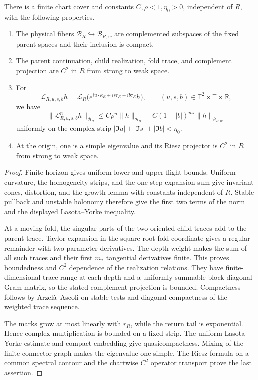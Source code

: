 \begin{theorem}
\label{thm:r16-a2-bundle}
There is a finite chart cover and constants
\(C,\rho<1,\eta_0>0\), independent of \(R\), with the following properties.
\begin{enumerate}[label=(\roman*)]
\item The physical fibers \(\mathcal B_R\hookrightarrow\mathcal B_{R,w}\)
are complemented subspaces of the fixed parent spaces and their inclusion is
compact.
\item The parent continuation, child realization, fold trace, and complement
projection are \(C^2\) in \(R\) from strong to weak space.
\item For
\[
 \mathcal L_{R,u,s,b}h
 =\mathcal L_R\bigl(e^{iu\cdot\kappa_R+isr_R+ib\tau_R}h\bigr),
 \qquad (u,s,b)\in\mathbb T^2\times\mathbb T\times\mathbb R,
\]
we have
\[
 \|\mathcal L_{R,u,s,b}^nh\|_{\mathcal B_R}
 \le C\rho^n\|h\|_{\mathcal B_R}
     +C(1+|b|)^{m_*}\|h\|_{\mathcal B_{R,w}}
\]
uniformly on the complex strip
\(|\Im u|+|\Im s|+|\Im b|<\eta_0\).
\item At the origin, one is a simple eigenvalue and its Riesz projector is
\(C^2\) in \(R\) from strong to weak space.
\end{enumerate}
\end{theorem}

\begin{proof}
Finite horizon gives uniform lower and upper flight bounds.  Uniform curvature,
the homogeneity strips, and the one-step expansion sum give invariant cones,
distortion, and the growth lemma with constants independent of \(R\).  Stable
pullback and unstable holonomy therefore give the first two terms of the norm
and the displayed Lasota--Yorke inequality.

At a moving fold, the singular parts of the two oriented child traces add to
the parent trace.  Taylor expansion in the square-root fold coordinate gives a
regular remainder with two parameter derivatives.  The depth weight makes the
sum of all such traces and their first \(m_*\) tangential derivatives finite.
This proves boundedness and \(C^2\) dependence of the realization relations.
They have finite-dimensional trace range at each depth and a uniformly
summable block diagonal Gram matrix, so the stated complement projection is
bounded.  Compactness follows by Arzel\`a--Ascoli on stable tests and diagonal
compactness of the weighted trace sequence.

The marks grow at most linearly with \(r_R\), while the return tail is
exponential.  Hence complex multiplication is bounded on a fixed strip.  The
uniform Lasota--Yorke estimate and compact embedding give quasicompactness.
Mixing of the finite connector graph makes the eigenvalue one simple.  The
Riesz formula on a common spectral contour and the chartwise \(C^2\) operator
transport prove the last assertion.
\end{proof}


